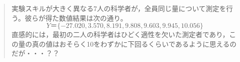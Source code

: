 \begin{quote}
	実験スキルが大きく異なる7人の科学者が，全員同じ量について測定を行う。彼らが得た数値結果は次の通り。
	$$Y＝\lbrace -27.020,3.570,8.191,9.808,9.603,9.945,10.056 \rbrace$$
	直感的には，最初の二人の科学者はひどく適性を欠いた測定者であり，この量の真の値はおそらく10をわずかに下回るくらいであるように思えるのだが・・・？？
\end{quote}
